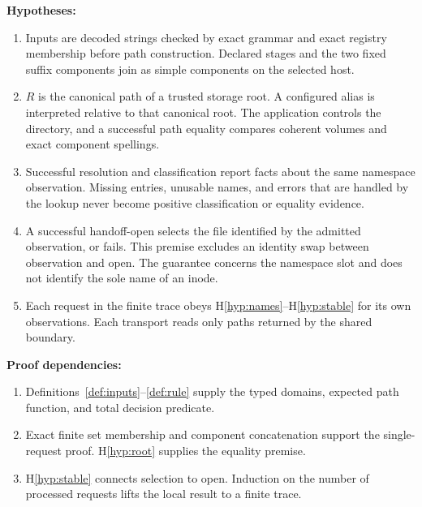 \documentclass[12pt]{article}
\begin{document}
\noindent\textbf{Hypotheses:}
\begin{enumerate}[label=H\arabic*.,ref=\arabic*]
\item\label{hyp:names} Inputs are decoded strings checked by exact
grammar and exact registry membership before path construction.
Declared stages and the two fixed suffix components join as simple
components on the selected host.
\item\label{hyp:root} $R$ is the canonical path of a trusted storage root.
A configured alias is interpreted relative to that canonical root.
The application controls the directory, and a successful path equality
compares coherent volumes and exact component spellings.
\item\label{hyp:io} Successful resolution and classification report
facts about the same namespace observation. Missing entries, unusable
names, and errors that are handled by the lookup never become positive
classification or equality evidence.
\item\label{hyp:stable} A successful handoff-open selects the file
identified by the admitted observation, or fails. This premise excludes
an identity swap between observation and open. The guarantee concerns
the namespace slot and does not identify the sole name of an inode.
\item\label{hyp:trace} Each request in the finite trace obeys
H\ref{hyp:names}--H\ref{hyp:stable} for its own observations. Each
transport reads only paths returned by the shared boundary.
\end{enumerate}

\noindent\textbf{Proof dependencies:}
\begin{enumerate}
\item Definitions~\ref{def:inputs}--\ref{def:rule} supply the typed
domains, expected path function, and total decision predicate.
\item Exact finite set membership and component concatenation support
the single-request proof. H\ref{hyp:root} supplies the equality premise.
\item H\ref{hyp:stable} connects selection to open. Induction on the
number of processed requests lifts the local result to a finite trace.
\end{enumerate}
\end{document}
